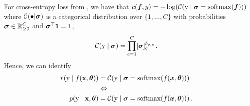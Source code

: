 \begin{example}\label{ex:cross_entropy_loss_probabilistic}
  For cross-entropy loss from , we have that $c({\bm{f}}, y) = - \log( {\mathcal{C}}({\textnormal{y}} \mid {\bm{\sigma}} = \mathrm{softmax}({\bm{f}}) ))$ where ${\mathcal{C}}(\bullet | {\bm{\sigma}})$ is a categorical distribution over $\{1, \dots, C\}$ with probabilities ${\bm{\sigma}} \in {\mathbb{R}}^C_{\ge 0}$ and ${\bm{\sigma}}^\top {\bm{1}} = 1$,
  \begin{align*}
    {\mathcal{C}}({\textnormal{y}} \mid {\bm{\sigma}})
    =
    \prod_{c=1}^C [{\bm{\sigma}}]_c^{\delta_{{\textnormal{y}},c}}\,.
  \end{align*}
  Hence, we can identify
  \begin{align*}
    r({\textnormal{y}} \mid f({\mathbf{x}}, {\bm{\theta}})) & = {\mathcal{C}}({\textnormal{y}} \mid {\bm{\sigma}} = \mathrm{softmax}(f({\bm{x}}, {\bm{\theta}})))\,
    \\
                                 & \Leftrightarrow
    \\
    p({\textnormal{y}} \mid {\mathbf{x}}, {\bm{\theta}})    & = {\mathcal{C}}({\textnormal{y}} \mid {\bm{\sigma}} = \mathrm{softmax}(f({\bm{x}}, {\bm{\theta}})))\,.
  \end{align*}
\end{example}
\switchcolumn[0]

